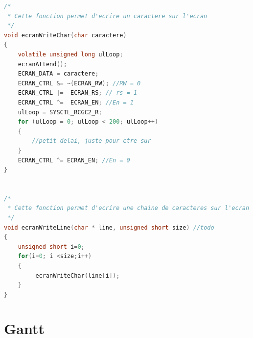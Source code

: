\begin{lstlisting}[language=C]
/*
 * Cette fonction permet d'ecrire un caractere sur l'ecran
 */
void ecranWriteChar(char caractere)
{
    volatile unsigned long ulLoop;
    ecranAttend();
    ECRAN_DATA = caractere;
    ECRAN_CTRL &= ~(ECRAN_RW); //RW = 0
    ECRAN_CTRL |=  ECRAN_RS; // rs = 1
    ECRAN_CTRL ^=  ECRAN_EN; //En = 1
    ulLoop = SYSCTL_RCGC2_R;
    for (ulLoop = 0; ulLoop < 200; ulLoop++) 
    {
        //petit delai, juste pour etre sur
    }
    ECRAN_CTRL ^= ECRAN_EN; //En = 0
}


/*
 * Cette fonction permet d'ecrire une chaine de caracteres sur l'ecran
 */
void ecranWriteLine(char * line, unsigned short size) //todo
{
    unsigned short i=0;
    for(i=0; i <size;i++)
    {
         ecranWriteChar(line[i]);
    }
}

\end{lstlisting}

\section{Gantt}



